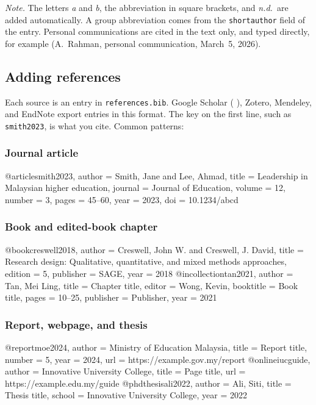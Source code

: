 \documentclass[11pt,a4paper]{article}
\newcommand\file[1]{\texttt{#1}}
\newcommand\then{\,\textrightarrow\,}
\begin{document}
\textit{Note.} The letters \emph{a} and \emph{b}, the abbreviation in square
brackets, and \emph{n.d.}\ are added automatically. A group abbreviation comes
from the \texttt{shortauthor} field of the entry. Personal communications are
cited in the text only, and typed directly, for example (A.~Rahman, personal
communication, March~5, 2026).

\subsection{Adding references}

Each source is an entry in \file{references.bib}. Google Scholar
(\then{}), Zotero, Mendeley, and EndNote export entries in
this format. The key on the first line, such as \texttt{smith2023}, is what you
cite. Common patterns:

\subsubsection*{Journal article}
\begin{bib}
@article{smith2023,
  author  = {Smith, Jane and Lee, Ahmad},
  title   = {Leadership in {Malaysian} higher education},
  journal = {Journal of Education},
  volume  = {12}, number = {3}, pages = {45--60},
  year    = {2023}, doi = {10.1234/abcd}
}
\end{bib}

\subsubsection*{Book and edited-book chapter}
\begin{bib}
@book{creswell2018,
  author = {Creswell, John W. and Creswell, J. David},
  title  = {Research design: {Qualitative}, quantitative, and mixed methods approaches},
  edition = {5}, publisher = {SAGE}, year = {2018}
}
@incollection{tan2021,
  author = {Tan, Mei Ling}, title = {Chapter title},
  editor = {Wong, Kevin}, booktitle = {Book title},
  pages = {10--25}, publisher = {Publisher}, year = {2021}
}
\end{bib}

\subsubsection*{Report, webpage, and thesis}
\begin{bib}
@report{moe2024,
  author = {{Ministry of Education Malaysia}}, title = {Report title},
  number = {5}, year = {2024}, url = {https://example.gov.my/report}
}
@online{iucguide,
  author = {{Innovative University College}}, title = {Page title},
  url = {https://example.edu.my/guide}       %
}
@phdthesis{ali2022,
  author = {Ali, Siti}, title = {Thesis title},
  school = {Innovative University College}, year = {2022}
}
\end{bib}
\end{document}
